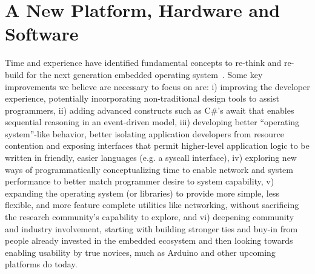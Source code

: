 \section{A New Platform, Hardware and Software}


Time and experience have identified fundamental concepts to re-think and
re-build for the next generation embedded operating
system~\cite{tinyos-retrospective}. Some key improvements we believe are
necessary to focus on are: i) improving the developer experience, potentially
incorporating non-traditional design tools to assist
programmers, %
ii) adding advanced constructs such as C\#'s
await that enables sequential reasoning in an event-driven model, iii) developing
better ``operating system''-like behavior, better isolating application
developers from resource contention and exposing interfaces that permit
higher-level application logic to be written in friendly, easier languages
(e.g. a syscall interface), iv) exploring new ways of programmatically
conceptualizing time to enable network and system performance to better match
programmer desire to system capability, v) expanding the operating system (or libraries)
to provide more simple, less flexible, and more feature complete utilities
like networking, without sacrificing the research community's capability to
explore, and vi) deepening community and industry involvement, starting with
building stronger ties and buy-in from people already invested in the embedded
ecosystem and then looking towards enabling usability by true novices, much as
Arduino and other upcoming platforms do today.

%




